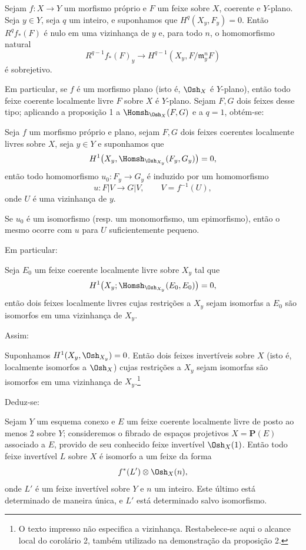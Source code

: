  Sejam $f:X\longrightarrow Y$ um morfismo próprio e $F$
um feixe sobre $X$, coerente e $Y$-plano. Seja $y\in Y$, seja $q$ um inteiro, e
suponhamos que $H^q(X_y,F_y)=0$. Então $R^qf_*(F)$ é nulo em uma vizinhança de
$y$ e, para todo $n$, o homomorfismo natural
\[
  R^{q-1}f_*(F)_y\longrightarrow
  H^{q-1}(X_y,F/\mathfrak m_y^nF)
\]
é sobrejetivo.

Em particular, se $f$ é um morfismo plano (isto é, $\Osh_X$ é $Y$-plano),
então todo feixe coerente localmente livre $F$ sobre $X$ é $Y$-plano. Sejam
$F,G$ dois feixes desse tipo; aplicando a proposição 1 a
$\Homsh_{\Osh_X}(F,G)$ e a $q=1$, obtém-se:

 Seja $f$ um morfismo próprio e plano, sejam $F,G$ dois feixes
coerentes localmente livres sobre $X$, seja $y\in Y$ e suponhamos que
\[
  H^1\bigl(X_y,\Homsh_{\Osh_{X_y}}(F_y,G_y)\bigr)=0,
\]
então todo homomorfismo $u_0:F_y\longrightarrow G_y$ é induzido por um
homomorfismo
\[
  u:F|V\longrightarrow G|V,
  \qquad V=f^{-1}(U),
\]
onde $U$ é uma vizinhança de $y$.

 Se $u_0$ é um isomorfismo (resp. um monomorfismo, um
epimorfismo), então o mesmo ocorre com $u$ para $U$ suficientemente
pequeno.

Em particular:

 Seja $E_0$ um feixe coerente localmente livre sobre $X_y$
tal que
\[
  H^1\bigl(X_y;\Homsh_{\Osh_{X_y}}(E_0,E_0)\bigr)=0,
\]
então dois feixes localmente livres cujas restrições a $X_y$ sejam isomorfas
a $E_0$ são isomorfos em uma vizinhança de $X_y$.

Assim:

 Suponhamos $H^1(X_y,\Osh_{X_y})=0$. Então dois feixes
invertíveis sobre $X$ (isto é, localmente isomorfos a $\Osh_X$) cujas
restrições a $X_y$ sejam isomorfas são isomorfos em uma vizinhança de $X_y$.\footnote{O texto impresso não especifica a vizinhança. Restabelece-se aqui o alcance local do corolário 2, também utilizado na demonstração da proposição 2.}

Deduz-se:

 Sejam $Y$ um esquema conexo e $E$ um feixe coerente localmente livre de posto ao menos $2$ sobre $Y$; consideremos o fibrado de espaços projetivos
$X=\mathbf P(E)$ associado a $E$, provido de seu conhecido feixe invertível
$\Osh_X(1)$. Então todo feixe invertível $L$ sobre $X$ é isomorfo a um feixe da
forma
\[
  f^*(L')\otimes\Osh_X(n),
\]
onde $L'$ é um feixe invertível sobre $Y$ e $n$ um inteiro. Este último está
determinado de maneira única, e $L'$ está determinado salvo isomorfismo.

